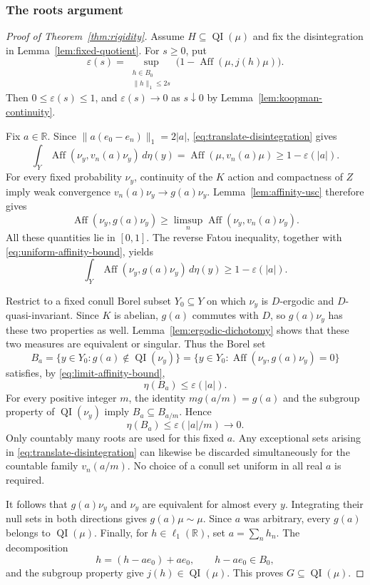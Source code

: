 \documentclass[11pt]{article}
\numberwithin{equation}{section}
\theoremstyle{definition}
\newcommand{\R}{\mathbb R}
\newcommand{\Aff}{\operatorname{Aff}}
\newcommand{\QI}{\operatorname{QI}}
\begin{document}
\subsubsection{The roots argument}

\begin{proof}[Proof of Theorem~\ref{thm:rigidity}]
Assume $H\subseteq\QI(\mu)$ and fix the disintegration in
Lemma~\ref{lem:fixed-quotient}. For $s\geq0$, put
\[
 \varepsilon(s)=
 \sup_{\substack{h\in B_0\\\|h\|_1\leq2s}}
       \bigl(1-\Aff(\mu,j(h)\mu)\bigr).
\]
Then $0\leq\varepsilon(s)\leq1$, and
$\varepsilon(s)\to0$ as $s\downarrow0$ by
Lemma~\ref{lem:koopman-continuity}.

Fix $a\in\R$. Since $\|a(e_0-e_n)\|_1=2|a|$,
\eqref{eq:translate-disintegration} gives
\begin{equation}\label{eq:uniform-affinity-bound}
 \int_Y\Aff(\nu_y,v_n(a)\nu_y)\,d\eta(y)
 =\Aff(\mu,v_n(a)\mu)\geq1-\varepsilon(|a|).
\end{equation}
For every fixed probability $\nu_y$, continuity of the $K$ action and
compactness of $Z$ imply weak convergence
$v_n(a)\nu_y\to g(a)\nu_y$. Lemma~\ref{lem:affinity-usc} therefore
gives
\[
 \Aff(\nu_y,g(a)\nu_y)
 \geq\limsup_n\Aff(\nu_y,v_n(a)\nu_y).
\]
All these quantities lie in $[0,1]$. The reverse Fatou inequality,
together with \eqref{eq:uniform-affinity-bound}, yields
\begin{equation}\label{eq:limit-affinity-bound}
 \int_Y\Aff(\nu_y,g(a)\nu_y)\,d\eta(y)
 \geq1-\varepsilon(|a|).
\end{equation}

Restrict to a fixed conull Borel subset $Y_0\subseteq Y$ on which
$\nu_y$ is $D$-ergodic and $D$-quasi-invariant. Since $K$ is abelian,
$g(a)$ commutes with $D$, so $g(a)\nu_y$ has these two properties as
well. Lemma~\ref{lem:ergodic-dichotomy} shows that these two measures
are equivalent or singular. Thus the Borel set
\[
 B_a=\{y\in Y_0:g(a)\notin\QI(\nu_y)\}
     =\{y\in Y_0:\Aff(\nu_y,g(a)\nu_y)=0\}
\]
satisfies, by \eqref{eq:limit-affinity-bound},
\[
 \eta(B_a)\leq\varepsilon(|a|).
\]
For every positive integer $m$, the identity $m g(a/m)=g(a)$ and the
subgroup property of $\QI(\nu_y)$ imply
$B_a\subseteq B_{a/m}$. Hence
\[
 \eta(B_a)\leq\varepsilon(|a|/m)\longrightarrow0.
\]
Only countably many roots are used for this fixed $a$. Any exceptional
sets arising in \eqref{eq:translate-disintegration} can likewise be
discarded simultaneously for the
countable family $v_n(a/m)$. No choice of a conull set uniform in all
real $a$ is required.

It follows that $g(a)\nu_y$ and $\nu_y$ are equivalent for almost
every $y$. Integrating their null sets in both directions gives
$g(a)\mu\sim\mu$. Since $a$ was arbitrary, every $g(a)$ belongs to
$\QI(\mu)$. Finally, for $h\in\ell_1(\R)$, set
$a=\sum_nh_n$. The decomposition
\[
 h=(h-ae_0)+ae_0,
 \qquad h-ae_0\in B_0,
\]
and the subgroup property give $j(h)\in\QI(\mu)$. This proves
$G\subseteq\QI(\mu)$.
\end{proof}
\end{document}
